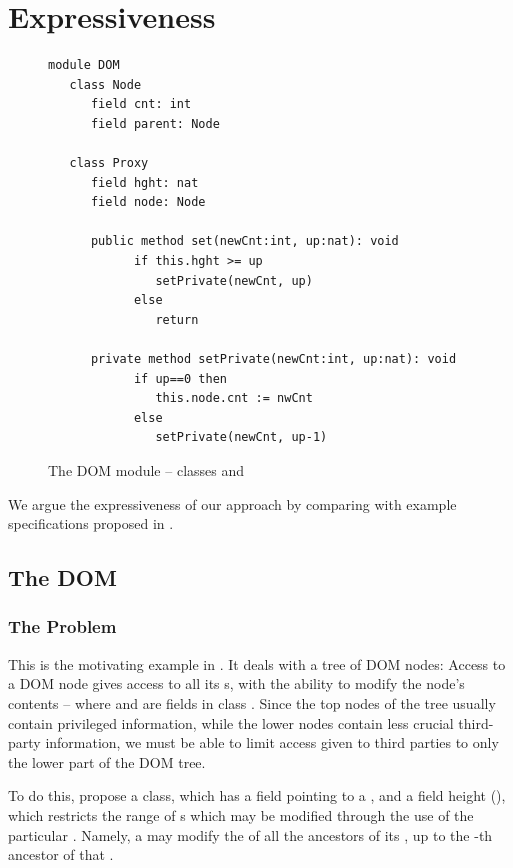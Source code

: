 \section{Expressiveness} 

\label{app:expressivity}


\begin{figure}[tbh]
\begin{lstlisting}[language = Chainmail, mathescape=true, frame=lines]
module DOM 
   class Node
      field cnt: int
      field parent: Node 
      
   class Proxy
      field hght: nat
      field node: Node
	
      public method set(newCnt:int, up:nat): void
            if this.hght >= up
               setPrivate(newCnt, up)
            else
               return
	       
      private method setPrivate(newCnt:int, up:nat): void
            if up==0 then
               this.node.cnt := nwCnt
            else
               setPrivate(newCnt, up-1)
\end{lstlisting}
\caption{The DOM module  -- classes  and }
\label{fig:DoMCode}
\end{figure}

We argue the expressiveness of our approach by comparing with example specifications  proposed in \cite{OOPSLA22,dd,irisWasm23}.

\subsection{The DOM}  %
\label{ss:DOM}

\subsubsection{The Problem} This is the motivating example in \cite{dd}. It
deals with a tree of DOM nodes: Access to a DOM node
gives access to all its s, %
with the ability to modify the node's contents   -- where   %
and  are fields in class . Since the top nodes of the tree
usually contain privileged information, while the lower nodes contain
less crucial third-party information, we must be able to limit 
 access given to third parties to only the lower part of the DOM tree. 
 
To do this,   \citet{dd}  propose   
  a  class, which has a field  pointing to a , and a field height (), which restricts the range of s which may be modified through the use of the particular . Namely,   a   may modify 
the  of all the ancestors of its  , up to the   -th ancestor of that . 

